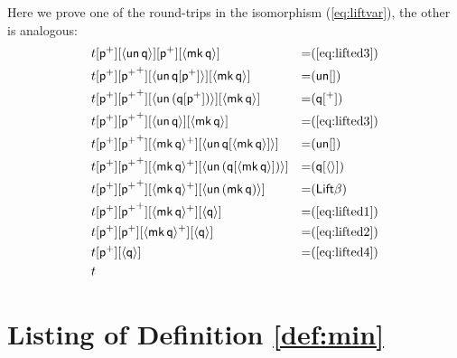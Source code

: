 \documentclass[a4paper,UKenglish]{article}
\newcommand{\p}{\mathsf{p}}
\newcommand{\q}{\mathsf{q}}
\newcommand{\Lift}{\mathsf{Lift}}
\newcommand{\mk}{\mathsf{mk}}
\newcommand{\un}{\mathsf{un}}
\begin{document}
Here we prove one of the round-trips in the isomorphism
(\ref{eq:liftvar}), the other is analogous:
\begin{alignat*}{10}
  & t[\p^+][\langle\un\,\q\rangle][\p^+][\langle\mk\,\q\rangle] && {=}(\ref{eq:lifted3}) \\
  & t[\p^+][{\p^+}^+][\langle\un\,\q[\p^+]\rangle][\langle\mk\,\q\rangle] && {=}(\un[]) \\
  & t[\p^+][{\p^+}^+][\langle\un\,(\q[\p^+])\rangle][\langle\mk\,\q\rangle] && {=}(\q[^+]) \\
  & t[\p^+][{\p^+}^+][\langle\un\,\q\rangle][\langle\mk\,\q\rangle] && {=}(\ref{eq:lifted3}) \\
  & t[\p^+][{\p^+}^+][\langle\mk\,\q\rangle^+][\langle\un\,\q[\langle\mk\,\q\rangle]\rangle] && {=}(\un[]) \\
  & t[\p^+][{\p^+}^+][\langle\mk\,\q\rangle^+][\langle\un\,(\q[\langle\mk\,\q\rangle])\rangle] && {=}(\q[\langle\rangle]) \\
  & t[\p^+][{\p^+}^+][\langle\mk\,\q\rangle^+][\langle\un\,(\mk\,\q)\rangle] && {=}(\Lift\beta) \\
  & t[\p^+][{\p^+}^+][\langle\mk\,\q\rangle^+][\langle\q\rangle] && {=}(\ref{eq:lifted1}) \\
  & t[\p^+][\p^+][\langle\mk\,\q\rangle^+][\langle\q\rangle] && {=}(\ref{eq:lifted2}) \\
  & t[\p^+][\langle\q\rangle] && {=}(\ref{eq:lifted4}) \\
  & t
\end{alignat*}

\section{Listing of Definition \ref{def:min}}
\label{app:minimisation}
\end{document}
